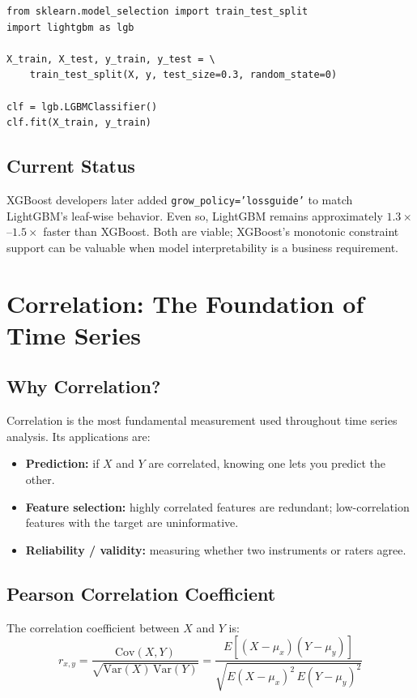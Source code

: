 \documentclass[11pt]{article}
\begin{document}
\begin{verbatim}
from sklearn.model_selection import train_test_split
import lightgbm as lgb

X_train, X_test, y_train, y_test = \
    train_test_split(X, y, test_size=0.3, random_state=0)

clf = lgb.LGBMClassifier()
clf.fit(X_train, y_train)
\end{verbatim}

\subsection{Current Status}
XGBoost developers later added \texttt{grow\_policy='lossguide'} to match
LightGBM's leaf-wise behavior. Even so, LightGBM remains approximately
$1.3\times$--$1.5\times$ faster than XGBoost. Both are viable; XGBoost's
monotonic constraint support can be valuable when model interpretability is a
business requirement.

\newpage
\section{Correlation: The Foundation of Time Series}
\label{sec:correlation}

\subsection{Why Correlation?}
Correlation is the most fundamental measurement used throughout time series analysis.
Its applications are:
\begin{itemize}
    \item \textbf{Prediction:} if $X$ and $Y$ are correlated, knowing one lets you
      predict the other.
    \item \textbf{Feature selection:} highly correlated features are redundant;
      low-correlation features with the target are uninformative.
    \item \textbf{Reliability / validity:} measuring whether two instruments or
      raters agree.
\end{itemize}

\subsection{Pearson Correlation Coefficient}

The correlation coefficient between $X$ and $Y$ is:
\[
r_{x,y} = \frac{\text{Cov}(X,Y)}{\sqrt{\text{Var}(X)\,\text{Var}(Y)}}
         = \frac{E[(X-\mu_x)(Y-\mu_y)]}{\sqrt{E(X-\mu_x)^2\,E(Y-\mu_y)^2}}
\]
\end{document}
